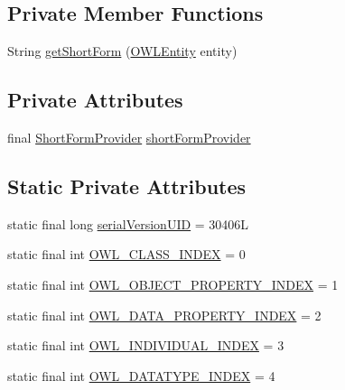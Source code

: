 \subsection*{Private Member Functions}
\begin{DoxyCompactItemize}
\item 
String \hyperlink{classorg_1_1semanticweb_1_1owlapi_1_1util_1_1_o_w_l_entity_comparator_aea1865a9e4e16fc2662aed569681de3b}{get\-Short\-Form} (\hyperlink{interfaceorg_1_1semanticweb_1_1owlapi_1_1model_1_1_o_w_l_entity}{O\-W\-L\-Entity} entity)
\end{DoxyCompactItemize}
\subsection*{Private Attributes}
\begin{DoxyCompactItemize}
\item 
final \hyperlink{interfaceorg_1_1semanticweb_1_1owlapi_1_1util_1_1_short_form_provider}{Short\-Form\-Provider} \hyperlink{classorg_1_1semanticweb_1_1owlapi_1_1util_1_1_o_w_l_entity_comparator_add68940b53f7201f040c1acec502c179}{short\-Form\-Provider}
\end{DoxyCompactItemize}
\subsection*{Static Private Attributes}
\begin{DoxyCompactItemize}
\item 
static final long \hyperlink{classorg_1_1semanticweb_1_1owlapi_1_1util_1_1_o_w_l_entity_comparator_ab296b79b2a201228c1eede336977dc31}{serial\-Version\-U\-I\-D} = 30406\-L
\item 
static final int \hyperlink{classorg_1_1semanticweb_1_1owlapi_1_1util_1_1_o_w_l_entity_comparator_a3c8faf10da30604d75089340d7899713}{O\-W\-L\-\_\-\-C\-L\-A\-S\-S\-\_\-\-I\-N\-D\-E\-X} = 0
\item 
static final int \hyperlink{classorg_1_1semanticweb_1_1owlapi_1_1util_1_1_o_w_l_entity_comparator_a24fdbc8bccf8d1efff37c1ad1902e714}{O\-W\-L\-\_\-\-O\-B\-J\-E\-C\-T\-\_\-\-P\-R\-O\-P\-E\-R\-T\-Y\-\_\-\-I\-N\-D\-E\-X} = 1
\item 
static final int \hyperlink{classorg_1_1semanticweb_1_1owlapi_1_1util_1_1_o_w_l_entity_comparator_a181b11785aa2c2011912bd484a528d0e}{O\-W\-L\-\_\-\-D\-A\-T\-A\-\_\-\-P\-R\-O\-P\-E\-R\-T\-Y\-\_\-\-I\-N\-D\-E\-X} = 2
\item 
static final int \hyperlink{classorg_1_1semanticweb_1_1owlapi_1_1util_1_1_o_w_l_entity_comparator_a9ff4945144c1a569bcb1c7108837c2f9}{O\-W\-L\-\_\-\-I\-N\-D\-I\-V\-I\-D\-U\-A\-L\-\_\-\-I\-N\-D\-E\-X} = 3
\item 
static final int \hyperlink{classorg_1_1semanticweb_1_1owlapi_1_1util_1_1_o_w_l_entity_comparator_a810bcf6114150d7bfea843937d17ccb2}{O\-W\-L\-\_\-\-D\-A\-T\-A\-T\-Y\-P\-E\-\_\-\-I\-N\-D\-E\-X} = 4
\end{DoxyCompactItemize}


